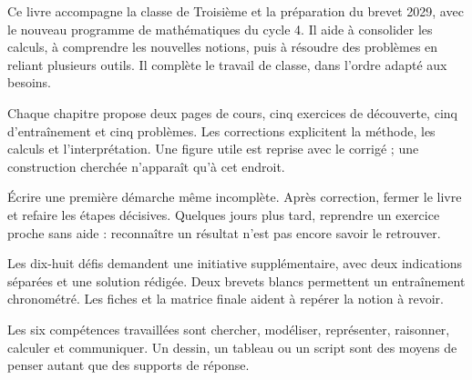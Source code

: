 \clearpage\thispagestyle{otFront}\label{avant-propos}\fontsize{11}{15}\selectfont

Ce livre accompagne la classe de Troisième et la préparation du brevet 2029,
avec le nouveau programme de mathématiques du cycle 4. Il aide à consolider les
calculs, à comprendre les nouvelles notions, puis à résoudre des problèmes en
reliant plusieurs outils. Il complète le travail de classe, dans l’ordre adapté aux besoins.\par\medskip
\begin{savoirfaire}Chaque chapitre propose deux pages de cours, cinq exercices de découverte, cinq d’entraînement et cinq problèmes. Les corrections explicitent la méthode, les calculs et l’interprétation. Une figure utile est reprise avec le corrigé ; une construction cherchée n’apparaît qu’à cet endroit.\end{savoirfaire}
\begin{savoirfaire}Écrire une première démarche même incomplète. Après correction, fermer le livre et refaire les étapes décisives. Quelques jours plus tard, reprendre un exercice proche sans aide : reconnaître un résultat n’est pas encore savoir le retrouver.\end{savoirfaire}
\begin{savoirfaire}Les dix-huit défis demandent une initiative supplémentaire, avec deux indications séparées et une solution rédigée. Deux brevets blancs permettent un entraînement chronométré. Les fiches et la matrice finale aident à repérer la notion à revoir.\end{savoirfaire}
Les six compétences travaillées sont chercher, modéliser, représenter,
raisonner, calculer et communiquer. Un dessin, un tableau ou un script sont
des moyens de penser autant que des supports de réponse.

\clearpage
